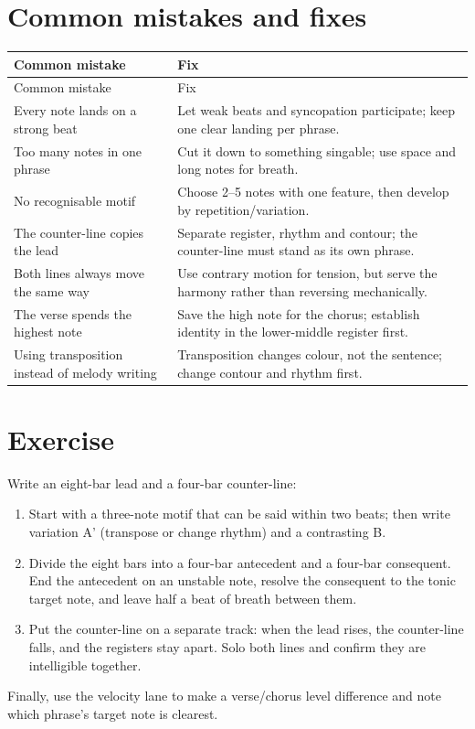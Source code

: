 
\section{Common mistakes and fixes}
\label{sec:melody-mistakes}

\begin{longtable}{p{}p{}}
\toprule
Common mistake & Fix \\
\midrule
\endfirsthead
\toprule
Common mistake & Fix \\
\midrule
\endhead
Every note lands on a strong beat & Let weak beats and syncopation participate; keep one clear landing per phrase. \\
Too many notes in one phrase & Cut it down to something singable; use space and long notes for breath. \\
No recognisable motif & Choose 2--5 notes with one feature, then develop by repetition/variation. \\
The counter-line copies the lead & Separate register, rhythm and contour; the counter-line must stand as its own phrase. \\
Both lines always move the same way & Use contrary motion for tension, but serve the harmony rather than reversing mechanically. \\
The verse spends the highest note & Save the high note for the chorus; establish identity in the lower-middle register first. \\
Using transposition instead of melody writing & Transposition changes colour, not the sentence; change contour and rhythm first. \\
\bottomrule
\end{longtable}

\section{Exercise}
\label{sec:melody-exercise}

\begin{exercise}
Write an eight-bar lead and a four-bar counter-line:
\begin{enumerate}
\item Start with a three-note motif that can be said within two beats; then write variation A' (transpose or change rhythm) and a contrasting B.
\item Divide the eight bars into a four-bar antecedent and a four-bar consequent. End the antecedent on an unstable note, resolve the consequent to the tonic target note, and leave half a beat of breath between them.
\item Put the counter-line on a separate track: when the lead rises, the counter-line falls, and the registers stay apart. Solo both lines and confirm they are intelligible together.
\end{enumerate}
Finally, use the velocity lane to make a verse/chorus level difference and note which phrase's target note is clearest.
\end{exercise}

